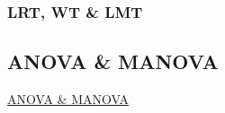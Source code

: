 \documentclass[10pt,
  aspectratio=169,
  serif,
  mathserif,
  professionalfont,
  compress,
  handout,
  ]{beamer}\usepackage[]{graphicx}\usepackage[]{color}
\begin{document}

\begin{frame}
  \frametitle{LRT, WT \& LMT}

\begin{figure} %
\end{figure} %

\end{frame}


\subsection{ANOVA \& MANOVA}


\begin{frame}[c, allowframebreaks]

\begin{center}

  {\normalsize \href{https://lineu96.github.io/st/}{ANOVA \& MANOVA}}
  
\end{center}

\end{frame}
\end{document}
